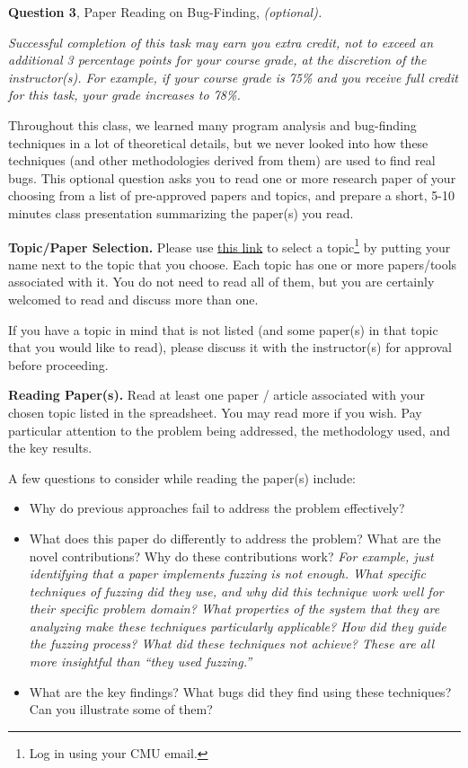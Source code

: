 \documentclass[11pt]{article}
\newcommand{\optionalquestion}[2]
  {\bigskip \noindent
  {\bf Question #1}, {#2}, {\it(optional).}}
\begin{document}
\newpage

\optionalquestion{3}{Paper Reading on Bug-Finding}

\emph{
Successful completion of this task may earn you extra credit, not to exceed an additional 3 percentage points for your course grade, at the discretion of the instructor(s). For example, if your course grade is 75\% and you receive full credit for this task, your grade increases to 78\%.
}

Throughout this class, we learned many program analysis and bug-finding techniques in a lot of theoretical details, but we never looked into how these techniques (and other methodologies derived from them) are used to find real bugs. This optional question asks you to read one or more research paper of your choosing from a list of pre-approved papers and topics, and prepare a short, 5-10 minutes class presentation summarizing the paper(s) you read.

\vspace{1em}
\noindent\textbf{Topic/Paper Selection.} Please use \href{https://docs.google.com/spreadsheets/d/1CNaxszvSpcCFQ9AK9qFv95xHyorUQ9-02bErdetcyjE/edit?usp=sharing}{this link} to select a topic\footnote{Log in using your CMU email.} by putting your name next to the topic that you choose. Each topic has one or more papers/tools associated with it. You do not need to read all of them, but you are certainly welcomed to read and discuss more than one.

If you have a topic in mind that is not listed (and some paper(s) in that topic that you would like to read), please discuss it with the instructor(s) for approval before proceeding.

\vspace{1em}
\noindent\textbf{Reading Paper(s).} Read at least one paper / article associated with your chosen topic listed in the spreadsheet. You may read more if you wish. Pay particular attention to the problem being addressed, the methodology used, and the key results.

A few questions to consider while reading the paper(s) include:
\begin{itemize}
  \item Why do previous approaches fail to address the problem effectively?
  \item What does this paper do differently to address the problem? What are the novel contributions? Why do these contributions work? \emph{For example, just identifying that a paper implements fuzzing is not enough. What specific techniques of fuzzing did they use, and why did this technique work well for their specific problem domain? What properties of the system that they are analyzing make these techniques particularly applicable? How did they guide the fuzzing process? What did these techniques not achieve? These are all more insightful than ``they used fuzzing.''}
  \item What are the key findings? What bugs did they find using these techniques? Can you illustrate some of them?
\end{itemize}
\end{document}
